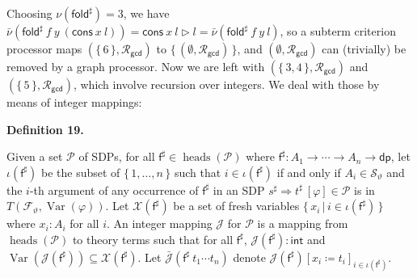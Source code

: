 \documentclass[10pt,a4paper]{amsart}
\providecommand{\coloneq}{\coloneqq}
\begin{document}
 
 
 
Choosing $\nu(\mathsf{fold}^{\sharp})=3$, we have $\bar{\nu}({{{\mathsf{fold}^{\sharp}}\ {f}}\ {y}}\ {({{\mathsf{cons}}\ {x}}\ {l})})={{\mathsf{cons}}\ {x}}\ {l}\vartriangleright l=\bar{\nu}({{{\mathsf{fold}^{\sharp}}\ {f}}\ {y}}\ {l})$, so a subterm criterion processor maps $(\{\,\text{6}\,\},\mathcal{R}_{\mathsf{gcd}})$ to $\{\,(\emptyset,\mathcal{R}_{\mathsf{gcd}})\,\}$, and $(\emptyset,\mathcal{R}_{\mathsf{gcd}})$ can (trivially) be removed by a graph processor. Now we are left with $(\{\,\text{3},\text{4}\,\},\mathcal{R}_{\mathsf{gcd}})$ and $(\{\,\text{5}\,\},\mathcal{R}_{\mathsf{gcd}})$, which involve recursion over integers. We deal with those by means of integer mappings:\par
 
 
 
\par\medskip\noindent\textbf{Definition 19.}\par
 
 
Given a set $\mathcal{P}$ of SDPs, for all $\mathsf{f}^{\sharp}\in\operatorname{heads}(\mathcal{P})$ where $\mathsf{f}^{\sharp}:{A}_{1}\rightarrow\cdots\rightarrow{A}_{n}\rightarrow\mathsf{dp}$, let $\iota(\mathsf{f}^{\sharp})$ be the subset of $\{\,1,\ldots,n\,\}$ such that $i\in\iota(\mathsf{f}^{\sharp})$ if and only if $A_{i}\in{\mathcal{S}}_{\vartheta}$ and the $i$-th argument of any occurrence of $\mathsf{f}^{\sharp}$ in an SDP ${s^{\sharp}}\Rightarrow{t^{\sharp}}\ [\varphi]\in\mathcal{P}$ is in $T({\mathcal{F}}_{\vartheta},\operatorname{Var}(\varphi))$. Let $\mathcal{X}(\mathsf{f}^{\sharp})$ be a set of fresh variables $\{\,x_{i}\,|\,i\in\iota(\mathsf{f}^{\sharp})\,\}$ where $x_{i}:A_{i}$ for all $i$. An integer mapping $\mathcal{J}$ for $\mathcal{P}$ is a mapping from $\operatorname{heads}(\mathcal{P})$ to theory terms such that for all $\mathsf{f}^{\sharp}$, $\mathcal{J}(\mathsf{f}^{\sharp}):\mathsf{int}$ and $\operatorname{Var}(\mathcal{J}(\mathsf{f}^{\sharp}))\subseteq\mathcal{X}(\mathsf{f}^{\sharp})$. Let $\bar{\mathcal{J}}({\mathsf{f}^{\sharp}}\ {{t}_{1}\cdots{t}_{n}})$ denote $\mathcal{J}(\mathsf{f}^{\sharp})[{x_{i}}\coloneq{t_{i}}]_{i\in\iota(\mathsf{f}^{\sharp})}$.\par
 
\end{document}
